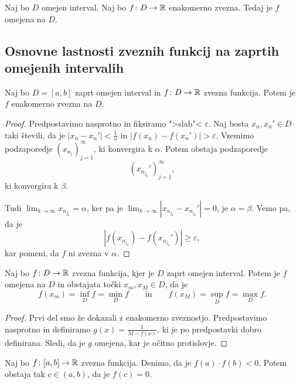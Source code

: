 \documentclass[12pt, a4paper]{article}
\begin{document}
\begin{trditev}
Naj bo $D$ omejen interval. Naj bo $f\colon D\to\mathbb{R}$ enakomerno zvezna. Tedaj je $f$ omejena na $D$.
\end{trditev}

\obvs

\newpage

\subsection{Osnovne lastnosti zveznih funkcij na zaprtih omejenih intervalih}

\begin{izrek}
Naj bo $D=[a,b]$ zaprt omejen interval in $f\colon D\to\mathbb{R}$ zvezna funkcija. Potem je $f$ enakomerno zvezna na $D$.
\end{izrek}

\begin{proof}
Predpostavimo nasprotno in fiksiramo ">slab"< $\varepsilon$. Naj bosta $x_n,x_n'\in D$ taki števili, da je $|x_n-x_n'|<\frac{1}{n}$ in $|f(x_n)-f(x_n')|>\varepsilon$. Vzemimo podzaporedje $\left(x_{n_j}\right)_{j=1}^\infty$, ki konvergira k $\alpha$. Potem obstaja podzaporedje
\[
\left(x_{n_{j_k}}'\right)_{j=1}^\infty,
\]
ki konvergira k $\beta$.

Tudi $\displaystyle\lim_{k\to\infty}x_{n_{j_k}}=\alpha$, ker pa je $\displaystyle\lim_{k\to\infty}\left|x_{n_{j_k}}-x_{n_{j_k}}'\right|=0$, je $\alpha=\beta.$ Vemo pa, da je
\[
\left|f\left(x_{n_{j_k}}\right)-f\left(x_{n_{j_k}}'\right)\right|\geq\varepsilon,
\]
kar pomeni, da $f$ ni zvezna v $\alpha$.
\end{proof}

\begin{izrek}
Naj bo $f\colon D\to\mathbb{R}$ zvezna funkcija, kjer je $D$ zaprt omejen interval. Potem je $f$ omejena na $D$ in obstajata točki $x_m,x_M\in D$, da je
\[
f(x_m)=\inf_D f=\min_D f\qquad\text{in}\qquad f(x_M)=\sup_D f=\max_D f.
\]
\end{izrek}

\begin{proof}
Prvi del smo že dokazali z enakomerno zveznostjo. Predpostavimo nasprotno in definiramo $g(x)=\frac{1}{M-f(x)}$, ki je po predpostavki dobro definirana. Sledi, da je $g$ omejena, kar je očitno protislovje.
\end{proof}

\begin{izrek}
Naj bo $f\colon [a,b]\to\mathbb{R}$ zvezna funkcija. Denimo, da je $f(a)\cdot f(b)<0$. Potem obstaja tak $c\in(a,b)$, da je $f(c)=0$.
\end{izrek}
\end{document}
